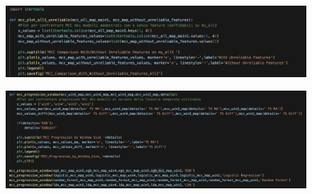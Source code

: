 \begin{appendices}
\begin{figure}[H]
    \centering
    \includegraphics[width=1\linewidth]{32.png}
    \label{fig:enter-label}
\end{figure}

\begin{figure}[H]
    \centering
    \includegraphics[width=1\linewidth]{33.png}
    \label{fig:enter-label}
\end{figure}
\end{appendices}
